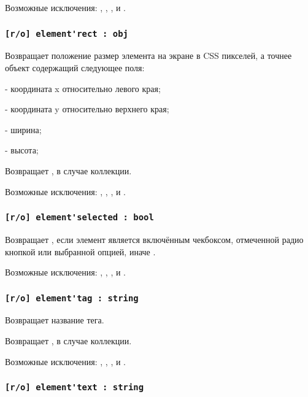 Возможные исключения: , , ,  и .

\subsubsection{\lstinline|[r/o] element'rect : obj|}

Возвращает положение размер элемента на экране в CSS пикселей, а точнее объект содержащий следующее поля:
\begin{icItems}
	\item {} - координата x относительно левого края;
	\item {} - координата y относительно верхнего края;
	\item {} - ширина;
	\item {} - высота;
\end{icItems}

\code{[icL]} Возвращает \set, в случае коллекции.

Возможные исключения: , , ,  и .

\subsubsection{\lstinline|[r/o] element'selected : bool|}

Возвращает \true, если элемент является включённым чекбоксом, отмеченной радио кнопкой или выбранной опцией, иначе \false.

Возможные исключения: , , ,  и .

\subsubsection{\lstinline|[r/o] element'tag : string|}

Возвращает название тега.

\code{[icL]} Возвращает \listtype, в случае коллекции.

Возможные исключения: , , ,  и .

\subsubsection{\lstinline|[r/o] element'text : string|}

